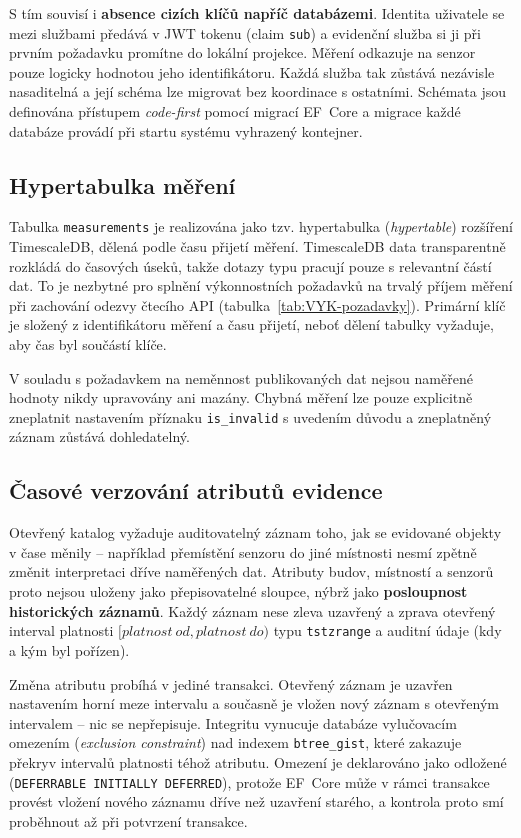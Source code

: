 S tím souvisí i \textbf{absence cizích klíčů napříč databázemi}. Identita uživatele se mezi službami předává v JWT tokenu (claim \texttt{sub}) a evidenční služba si ji při prvním požadavku promítne do lokální projekce. Měření odkazuje na senzor pouze logicky hodnotou jeho identifikátoru. Každá služba tak zůstává nezávisle nasaditelná a její schéma lze migrovat bez koordinace s ostatními. Schémata jsou definována přístupem \emph{code-first} pomocí migrací EF~Core a migrace každé databáze provádí při startu systému vyhrazený kontejner.

\subsection{Hypertabulka měření}

Tabulka \texttt{measurements} je realizována jako tzv. hypertabulka (\emph{hypertable}) rozšíření TimescaleDB, dělená podle času přijetí měření. TimescaleDB data transparentně rozkládá do časových úseků, takže dotazy typu  pracují pouze s relevantní částí dat. To je nezbytné pro splnění výkonnostních požadavků na trvalý příjem měření při zachování odezvy čtecího API (tabulka~\ref{tab:VYK-pozadavky}). Primární klíč je složený z identifikátoru měření a času přijetí, neboť dělení tabulky vyžaduje, aby čas byl součástí klíče.

V souladu s požadavkem na neměnnost publikovaných dat nejsou naměřené hodnoty nikdy upravovány ani mazány. Chybná měření lze pouze explicitně zneplatnit nastavením příznaku \texttt{is\_invalid} s uvedením důvodu a zneplatněný záznam zůstává dohledatelný.

\subsection{Časové verzování atributů evidence}
\label{subsec:temporal}

Otevřený katalog vyžaduje auditovatelný záznam toho, jak se evidované objekty v čase měnily -- například přemístění senzoru do jiné místnosti nesmí zpětně změnit interpretaci dříve naměřených dat. Atributy budov, místností a senzorů proto nejsou uloženy jako přepisovatelné sloupce, nýbrž jako \textbf{posloupnost historických záznamů}. Každý záznam nese zleva uzavřený a zprava otevřený interval platnosti $[\mathit{platnost\ od}, \mathit{platnost\ do})$ typu \texttt{tstzrange} a auditní údaje (kdy a kým byl pořízen).

Změna atributu probíhá v jediné transakci. Otevřený záznam je uzavřen nastavením horní meze intervalu a současně je vložen nový záznam s otevřeným intervalem -- nic se nepřepisuje. Integritu vynucuje databáze vylučovacím omezením (\emph{exclusion constraint}) nad indexem \texttt{btree\_gist}, které zakazuje překryv intervalů platnosti téhož atributu. Omezení je deklarováno jako odložené (\texttt{DEFERRABLE INITIALLY DEFERRED}), protože EF~Core může v rámci transakce provést vložení nového záznamu dříve než uzavření starého, a kontrola proto smí proběhnout až při potvrzení transakce.

